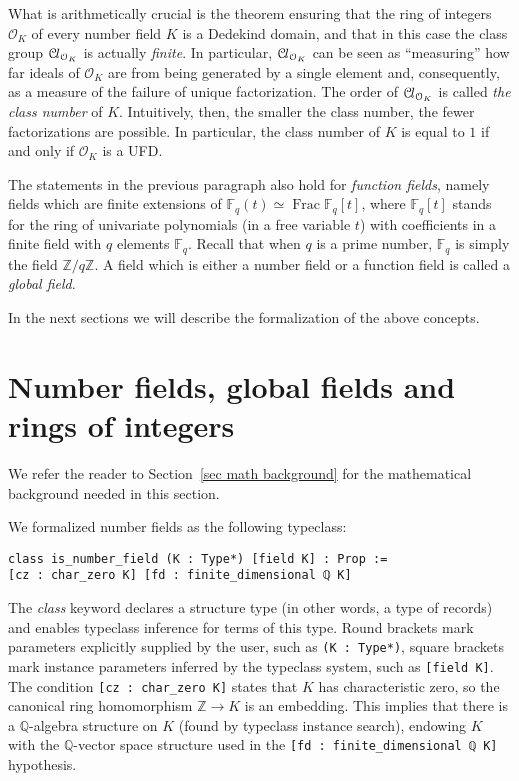 \documentclass[a4paper,USenglish,cleveref, autoref, thm-restate]{lipics-v2021}
\newcommand{\lean}[1]{\texttt{#1}\xspace}
\newcommand*{\OK}[1][K]{\mathcal{O}_{#1}}
\newcommand*{\Cl}{\mathcal{C}\kern-.075em l}
\newcommand*{\Fq}[1][q]{\mathbb{F}_{#1}}
\newcommand{\Q}{\mathbb{Q}}
\newcommand{\Z}{\mathbb{Z}}
\DeclareMathOperator{\Frac}{Frac}
\begin{document}
What is arithmetically crucial is the theorem ensuring that the ring of integers $\OK$ of every number field $K$ is a Dedekind domain,
and that in this case the class group $\Cl_{\OK}$ is actually \emph{finite}.
In particular, $\Cl_{\OK}$ can be seen as ``measuring'' how far ideals of $\OK$ are from being generated by a single element and,
consequently, as a measure of the failure of unique factorization.
The order of $\Cl_{\OK}$ is called \emph{the class number} of $K$.
Intuitively, then, the smaller the class number, the fewer factorizations are possible.
In particular, the class number of $K$ is equal to $1$ if and only if $\OK$ is a UFD.

The statements in the previous paragraph also hold for \emph{function fields}, namely fields which are finite extensions of $\Fq(t) \simeq \Frac \Fq[q][t]$, where $\Fq[q][t]$ stands for the ring of univariate polynomials (in a free variable $t$) with coefficients in a finite field with $q$ elements $\Fq$. Recall that when $q$ is a prime number, $\Fq$ is simply the field $\Z/q\Z$.
A field which is either a number field or a function field is called a \emph{global field}.

In the next sections we will describe the formalization of the above concepts.

\section{Number fields, global fields and rings of integers} \label{sec:number fields}

We refer the reader to Section~\ref{sec math background} for the mathematical background needed in this section.

We formalized number fields as the following typeclass:
\begin{lstlisting}
class is_number_field (K : Type*) [field K] : Prop :=
[cz : char_zero K] [fd : finite_dimensional ℚ K]
\end{lstlisting}
The \emph{class} keyword declares a structure type (in other words, a type of records) and enables typeclass inference for terms of this type.
Round brackets mark parameters explicitly supplied by the user, such as \lean{(K : Type*)},
square brackets mark instance parameters inferred by the typeclass system, such as \lean{[field K]}. The condition \lean{[cz : char\_zero K]} states that $K$ has characteristic zero, so the canonical ring homomorphism $\Z \to K$ is an embedding.
This implies that there is a $\Q$-algebra structure on $K$ (found by typeclass instance search), endowing $K$ with the $\Q$-vector space structure used in the \mbox{\lean{[fd : finite\_dimensional ℚ K]}} hypothesis.
\end{document}
